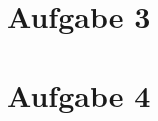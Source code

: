 \documentclass[titlepage]{article}
\renewcommand{\]}{\right]}
\renewcommand{\[}{\left[}
\renewcommand{\)}{\right)}
\renewcommand{\(}{\left(}
\renewcommand{\|}{\;|\;}
\begin{document}
	\pagebreak
	\section*{Aufgabe 3}
		\begin{center}
			
			
		\end{center}
	
	\section*{Aufgabe 4}
		\begin{center}
			
		\end{center}

	\endgroup	
\end{document}
